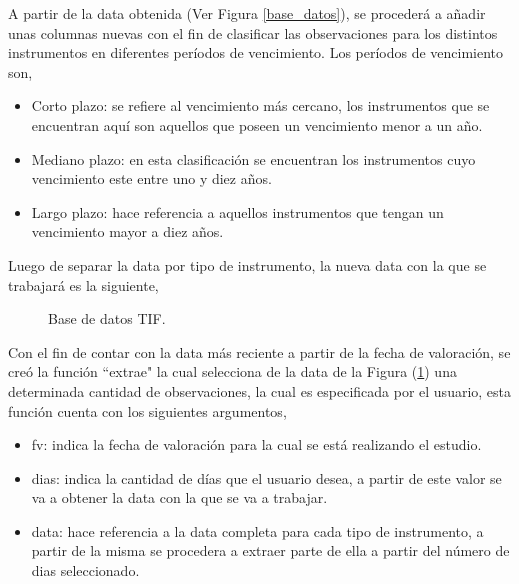 \hspace{0.4cm} A partir de la data obtenida (Ver Figura \ref{base_datos}), se proceder\'a a a\~nadir unas columnas nuevas con el fin de clasificar las observaciones para los distintos instrumentos en diferentes per\'iodos de vencimiento. Los per\'iodos de vencimiento son,

\begin{itemize}
\item Corto plazo: se refiere al vencimiento m\'as cercano, los instrumentos que se encuentran aqu\'i son aquellos que poseen un vencimiento menor a un a\~no.
\item Mediano plazo: en esta clasificaci\'on se encuentran los instrumentos cuyo vencimiento este entre uno y diez a\~nos.
\item Largo plazo: hace referencia a aquellos instrumentos que tengan un vencimiento mayor a diez a\~nos.
\end{itemize}

\hspace{0.4cm} Luego de separar la data por tipo de instrumento, la nueva data con la que se trabajar\'a es la siguiente,

\begin{figure}[h]
\caption{Base de datos TIF.}
\label{base_datos_tif}
\end{figure}

\hspace{0.4cm} Con el fin de contar con la data m\'as reciente a partir de la fecha de valoraci\'on, se cre\'o la funci\'on ``extrae" \hspace{0.01cm} la cual selecciona de la data de la Figura (\ref{base_datos_tif}) una determinada cantidad de observaciones, la cual es especificada por el usuario, esta funci\'on cuenta con los siguientes argumentos,

\begin{itemize}
 \item fv: indica la fecha de valoraci\'on para la cual se est\'a realizando el estudio.
 \item dias: indica la cantidad de d\'ias que el usuario desea, a partir de este valor se va a obtener la data con la que se va a trabajar.
 \item data: hace referencia a la data completa para cada tipo de instrumento, a partir de la misma se procedera a extraer parte de ella a partir del n\'umero de dias seleccionado.
\end{itemize}

